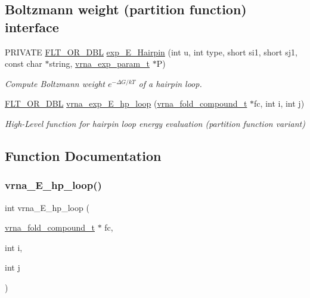 \subsection*{Boltzmann weight (partition function) interface}
\begin{DoxyCompactItemize}
\item 
P\+R\+I\+V\+A\+TE \mbox{\hyperlink{group__data__structures_ga31125aeace516926bf7f251f759b6126}{F\+L\+T\+\_\+\+O\+R\+\_\+\+D\+BL}} \mbox{\hyperlink{group__eval__loops__hp_ga51fb555974f180b78d76142b2894851c}{exp\+\_\+\+E\+\_\+\+Hairpin}} (int u, int type, short si1, short sj1, const char $\ast$string, \mbox{\hyperlink{group__energy__parameters_ga01d8b92fe734df8d79a6169482c7d8d8}{vrna\+\_\+exp\+\_\+param\+\_\+t}} $\ast$P)
\begin{DoxyCompactList}\small\item\em Compute Boltzmann weight $e^{-\Delta G/kT} $ of a hairpin loop. \end{DoxyCompactList}\item 
\mbox{\hyperlink{group__data__structures_ga31125aeace516926bf7f251f759b6126}{F\+L\+T\+\_\+\+O\+R\+\_\+\+D\+BL}} \mbox{\hyperlink{group__eval__loops__hp_gad62fe037be0a3fc6914676e5cb85be5e}{vrna\+\_\+exp\+\_\+\+E\+\_\+hp\+\_\+loop}} (\mbox{\hyperlink{group__fold__compound_ga1b0cef17fd40466cef5968eaeeff6166}{vrna\+\_\+fold\+\_\+compound\+\_\+t}} $\ast$fc, int i, int j)
\begin{DoxyCompactList}\small\item\em High-\/\+Level function for hairpin loop energy evaluation (partition function variant) \end{DoxyCompactList}\end{DoxyCompactItemize}


\subsection{Function Documentation}
\mbox{\label{group__eval__loops__hp_ga57179ea326cc5ed8dfe4d3962b233128}} 
\subsubsection{\texorpdfstring{vrna\_E\_hp\_loop()}{vrna\_E\_hp\_loop()}}
{\footnotesize\ttfamily int vrna\+\_\+\+E\+\_\+hp\+\_\+loop (\begin{DoxyParamCaption}\item[{\mbox{\hyperlink{group__fold__compound_ga1b0cef17fd40466cef5968eaeeff6166}{vrna\+\_\+fold\+\_\+compound\+\_\+t}} $\ast$}]{fc,  }\item[{int}]{i,  }\item[{int}]{j }\end{DoxyParamCaption})}



